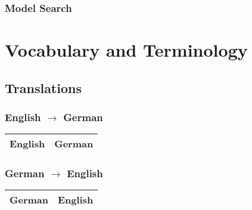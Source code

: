 \documentclass[a4paper, 11pt, accentcolor = tud3b]{tudreport}
\begin{document}
			\subsection{Model Search} %
	
	
	\appendix
	
	\chapter{Vocabulary and Terminology}
		\section{Translations}
			\subsection{English \(\to\) German}
				\begin{table}[H]
					\centering
					\begin{tabular}{l|l}
						\textbf{English} & \textbf{German} \\ \hline
						
					\end{tabular}
				\end{table}
			
			\subsection{German \(\to\) English}
				\begin{table}[H]
					\centering
					\begin{tabular}{l|l}
						\textbf{German} & \textbf{English} \\ \hline
						
					\end{tabular}
				\end{table}
\end{document}
